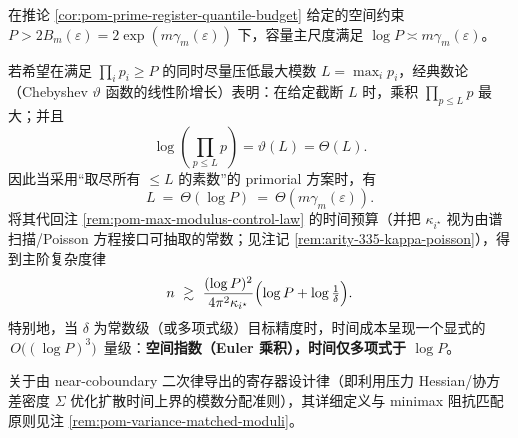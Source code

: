 \begin{remark}\label{rem:pom-primorial-polylog-time}
在推论 \ref{cor:pom-prime-register-quantile-budget} 给定的空间约束
\(
P>2B_m(\varepsilon)=2\exp(m\gamma_m(\varepsilon))
\)
下，容量主尺度满足 \(\log P\asymp m\gamma_m(\varepsilon)\)。
\par
若希望在满足 \(\prod_i p_i\ge P\) 的同时尽量压低最大模数 \(L=\max_i p_i\)，经典数论（Chebyshev \(\vartheta\) 函数的线性阶增长）表明：在给定截断 \(L\) 时，乘积 \(\prod_{p\le L}p\) 最大；并且
\[
\log\!\left(\prod_{p\le L}p\right)=\vartheta(L)=\Theta(L).
\]
因此当采用“取尽所有 \(\le L\) 的素数”的 primorial 方案时，有
\[
L\ =\ \Theta(\log P)\ =\ \Theta(m\gamma_m(\varepsilon)).
\]
将其代回注 \ref{rem:pom-max-modulus-control-law} 的时间预算（并把 \(\kappa_{i^\star}\) 视为由谱扫描/Poisson 方程接口可抽取的常数；见注记 \ref{rem:arity-335-kappa-poisson}），得到主阶复杂度律
\[
n\ \gtrsim\ \frac{(\log P)^2}{4\pi^2\kappa_{i^\star}}\Bigl(\log P+\log\tfrac{1}{\delta}\Bigr).
\]
特别地，当 \(\delta\) 为常数级（或多项式级）目标精度时，时间成本呈现一个显式的 \(\,O\big((\log P)^3\big)\,\) 量级：\textbf{空间指数（Euler 乘积），时间仅多项式于 \(\log P\)}。
\end{remark}

\begin{remark}[方差匹配的模数分配]
关于由 near-coboundary 二次律导出的寄存器设计律（即利用压力 Hessian/协方差密度 $\Sigma$ 优化扩散时间上界的模数分配准则），其详细定义与 minimax 阻抗匹配原则见注 \ref{rem:pom-variance-matched-moduli}。
\end{remark}

